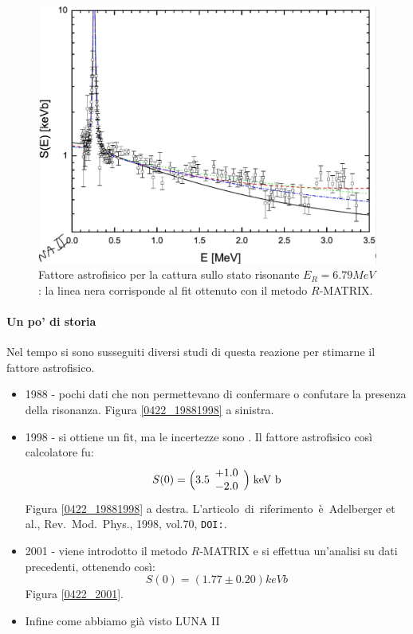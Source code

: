 \begin{itemize}
	\begin{figure}[!h]
		\centering
		\includegraphics[scale=0.5]{Immagini/0422_0-Se-2.png}
		\caption{Fattore astrofisico per la cattura sullo stato risonante $E_R=6.79\unit{MeV}$: la linea nera corrisponde al fit ottenuto con il metodo $R$-MATRIX.}
		\label{0422_Er2}
	\end{figure}	
\end{itemize}

\paragraph{Un po' di storia}
Nel tempo si sono susseguiti diversi studi di questa reazione per stimarne il fattore astrofisico. 
\begin{itemize}
	\item 1988 - pochi dati che non permettevano di confermare o confutare la presenza della risonanza. Figura \ref{0422_19881998} a sinistra.
	\item 1998 - si ottiene un fit, ma le incertezze sono . Il fattore astrofisico così calcolatore fu:
	$$S(0)= \Bigl ( 3.5\begin{array}{l}
		+1.0 \\
		-2.0
	\end{array}%
	\Bigr )\unit{keV b}$$
	Figura \ref{0422_19881998} a destra. L'articolo\ di\ riferimento\ è\ Adelberger et al., Rev.\ Mod.\ Phys., 1998, vol.70, \texttt{DOI:}.
	\item 2001 - viene introdotto il metodo $R$-MATRIX e si effettua un'analisi su dati precedenti, ottenendo così:
	$$S(0) = (1.77 \pm 0.20) \unit{keV b}$$
	Figura \ref{0422_2001}.
	\item Infine come abbiamo già visto LUNA II
\end{itemize}

